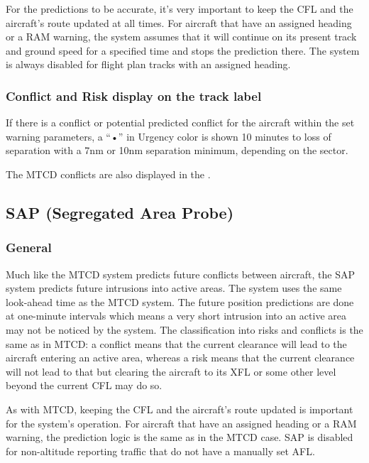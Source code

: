 \documentclass[a4paper,oneside,11pt]{memoir}
\newcommand{\colorref}[1]{\colorbox{Flight Highlight}{\color{#1}#1}}
\newcommand{\winref}[1]{\textit{\titleref{#1}}}
\begin{document}
For the predictions to be accurate, it’s very important to keep the CFL and the aircraft’s route updated at all times. For aircraft that have an assigned heading or a RAM warning, the system assumes that it will continue on its present track and ground speed for a specified time and stops the prediction there. The system is always disabled for flight plan tracks with an assigned heading.

\subsubsection*{Conflict and Risk display on the track label}

If there is a conflict or potential predicted conflict for the aircraft within the set warning parameters, a “•” in \colorref{Urgency} color is shown 10 minutes to loss of separation with a 7nm or 10nm separation minimum, depending on the sector.

\bigskip

The MTCD conflicts are also displayed in the \winref{win:card}.

\subsection{SAP (Segregated Area Probe)}
\label{tool:SAP}
\subsubsection*{General}

Much like the MTCD system predicts future conflicts between aircraft, the SAP system predicts future intrusions into active areas. The system uses the same look-ahead time as the MTCD system. The future position predictions are done at one-minute intervals which means a very short intrusion into an active area may not be noticed by the system. The classification into risks and conflicts is the same as in MTCD: a conflict means that the current clearance will lead to the aircraft entering an active area, whereas a risk means that the current clearance will not lead to that but clearing the aircraft to its XFL or some other level beyond the current CFL may do so.

\bigskip

As with MTCD, keeping the CFL and the aircraft’s route updated is important for the system’s operation. For aircraft that have an assigned heading or a RAM warning, the prediction logic is the same as in the MTCD case. SAP is disabled for non-altitude reporting traffic that do not have a manually set AFL.
\end{document}

